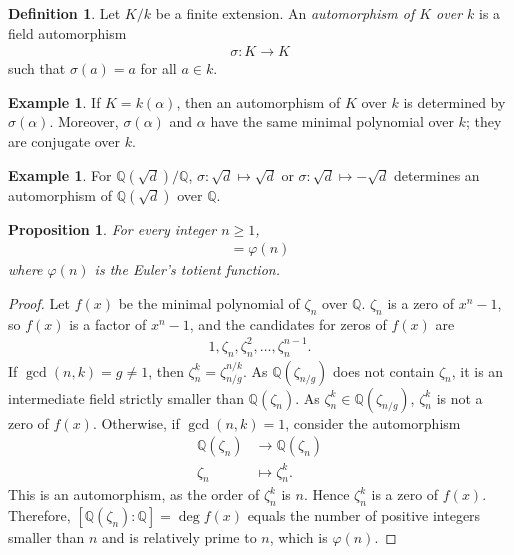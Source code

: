 \documentclass[12pt]{report}
\theoremstyle{plain}
\newtheorem{proposition}[theorem]{Proposition}
\theoremstyle{remark}
\theoremstyle{definition}
\newtheorem{definition}[theorem]{Definition}
\newtheorem{example}[theorem]{Example}
\newcommand{\Q}{\mathbb{Q}}
\begin{document}
\begin{definition}
    Let $K/k$ be a finite extension. An \emph{automorphism of $K$ over $k$} is a field automorphism
    \begin{align*}
        \sigma:K\rightarrow K
    \end{align*}
    such that $\sigma(a)=a$ for all $a\in k$.
\end{definition}

\begin{example}
    If $K=k(\alpha)$, then an automorphism of $K$ over $k$ is determined by $\sigma(\alpha)$. Moreover, $\sigma(\alpha)$ and $\alpha$ have the same minimal polynomial over $k$; they are conjugate over $k$.
\end{example}

\begin{example}
    For $\Q(\sqrt{d})/\Q$, $\sigma:\sqrt{d}\mapsto \sqrt{d}$ or $\sigma:\sqrt{d}\mapsto -\sqrt{d}$ determines an automorphism of $\Q(\sqrt{d})$ over $\Q$.
\end{example}

\begin{proposition}
    For every integer $n\ge 1$,
    \begin{align*}
        [\Q(\zeta_n):\Q]=\varphi(n)
    \end{align*}
    where $\varphi(n)$ is the Euler's totient function.
\end{proposition}
\begin{proof}
    Let $f(x)$ be the minimal polynomial of $\zeta_n$ over $\Q$. $\zeta_n$ is a zero of $x^n-1$, so $f(x)$ is a factor of $x^n-1$, and the candidates for zeros of $f(x)$ are
    \begin{align*}
        1,\zeta_n,\zeta_n^2,\dots,\zeta_n^{n-1}.
    \end{align*}
    If $\gcd (n,k)=g\neq 1$, then $\zeta_n^k = \zeta_{n/g}^{n/k}$. As $\Q(\zeta_{n/g})$ does not contain $\zeta_n$, it is an intermediate field strictly smaller than $\Q(\zeta_n)$. As $\zeta_n^k\in \Q(\zeta_{n/g})$, $\zeta_n^k$ is not a zero of $f(x)$. Otherwise, if $\gcd (n,k)=1$, consider the automorphism
    \begin{align*}
        \Q(\zeta_n) & \rightarrow \Q(\zeta_n) \\
        \zeta_n &\mapsto \zeta_n^k.
    \end{align*}
    This is an automorphism, as the order of $\zeta_n^k$ is $n$. Hence $\zeta_n^k$ is a zero of $f(x)$. Therefore, $[\Q(\zeta_n):\Q]=\deg f(x)$ equals the number of positive integers smaller than $n$ and is relatively prime to $n$, which is $\varphi(n)$.
\end{proof}
\end{document}

